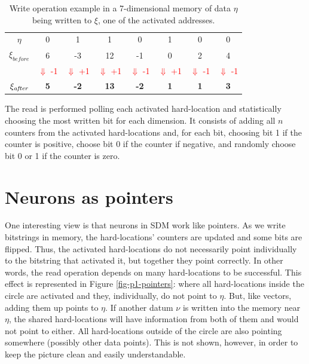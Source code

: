\begin{table}
\begin{tabular}{c|c|c|c|c|c|c|c|}
\cline{2-8}
$\eta$ & 0 & 1 & 1 & 0 & 1 & 0 & 0\tabularnewline
\cline{2-8}
$\xi_{\textit{before}}$ & 6 & -3 & 12 & -1 & 0 & 2 & 4\tabularnewline
\cline{2-8}
\multicolumn{1}{c}{} & \multicolumn{1}{c}{\textcolor{red}{\small{}$\Downarrow$ -1}} & \multicolumn{1}{c}{\textcolor{red}{\small{}$\Downarrow$ +1}} & \multicolumn{1}{c}{\textcolor{red}{\small{}$\Downarrow$ +1}} & \multicolumn{1}{c}{\textcolor{red}{\small{}$\Downarrow$ -1}} & \multicolumn{1}{c}{\textcolor{red}{\small{}$\Downarrow$ +1}} & \multicolumn{1}{c}{\textcolor{red}{\small{}$\Downarrow$ -1}} & \multicolumn{1}{c}{\textcolor{red}{\small{}$\Downarrow$ -1}}\tabularnewline
\cline{2-8}
$\xi_{\textit{\textit{after}}}$ & \textbf{5} & \textbf{-2} & \textbf{13} & \textbf{-2} & \textbf{1} & \textbf{1} & \textbf{3}\tabularnewline
\cline{2-8}
\end{tabular}

\caption{Write operation example in a 7-dimensional memory of data $\eta$
being written to $\xi$, one of the activated addresses.\label{tab:write operation}}


\end{table}


The read is performed polling each activated hard-location and statistically choosing the most written bit for each dimension. It consists of adding all $n$ counters from the activated hard-locations and, for each bit, choosing bit 1 if the counter is positive, choose bit 0 if the counter if negative, and randomly choose bit 0 or 1 if the counter is zero.


\section{Neurons as pointers}

One interesting view is that neurons in SDM work like pointers. As we write bitstrings in memory, the hard-locations' counters are updated and some bits are flipped. Thus, the activated hard-locations do not necessarily point individually to the bitstring that activated it, but together they point correctly. In other words, the read operation depends on many hard-locations to be successful. This effect is represented in Figure \ref{fig-p1-pointers}: where all hard-locations inside the circle are activated and they, individually, do not point to $\eta$.  But, like vectors, adding them up points to $\eta$. If another datum $\nu$ is written into the memory near $\eta$, the shared hard-locations will have information from both of them and would not point to either.  All hard-locations outside of the circle are also pointing somewhere (possibly other data points). This is not shown, however, in order to keep the picture clean and easily understandable.

